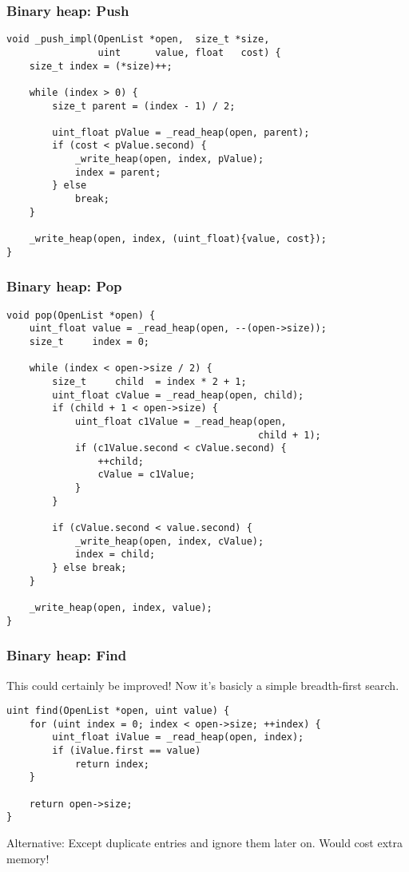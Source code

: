 \documentclass{beamer}
\begin{document}
\begin{frame}[fragile]
    \frametitle{Binary heap: Push}
    \begin{lstlisting}
void _push_impl(OpenList *open,  size_t *size,
                uint      value, float   cost) {
    size_t index = (*size)++;

    while (index > 0) {
        size_t parent = (index - 1) / 2;

        uint_float pValue = _read_heap(open, parent);
        if (cost < pValue.second) {
            _write_heap(open, index, pValue);
            index = parent;
        } else
            break;
    }

    _write_heap(open, index, (uint_float){value, cost});
}
    \end{lstlisting}
\end{frame}

\begin{frame}[fragile]
    \frametitle{Binary heap: Pop}
    \begin{lstlisting}
void pop(OpenList *open) {
    uint_float value = _read_heap(open, --(open->size));
    size_t     index = 0;

    while (index < open->size / 2) {
        size_t     child  = index * 2 + 1;
        uint_float cValue = _read_heap(open, child);
        if (child + 1 < open->size) {
            uint_float c1Value = _read_heap(open,
                                            child + 1);
            if (c1Value.second < cValue.second) {
                ++child;
                cValue = c1Value;
            }
        }

        if (cValue.second < value.second) {
            _write_heap(open, index, cValue);
            index = child;
        } else break;
    }

    _write_heap(open, index, value);
}
    \end{lstlisting}
\end{frame}

\begin{frame}[fragile]
    \frametitle{Binary heap: Find}
    This could certainly be improved! Now it's basicly a simple breadth-first search.
    
    \begin{lstlisting}
uint find(OpenList *open, uint value) {
    for (uint index = 0; index < open->size; ++index) {
        uint_float iValue = _read_heap(open, index);
        if (iValue.first == value)
            return index;
    }

    return open->size;
}
    \end{lstlisting}
    
    Alternative: Except duplicate entries and ignore them later on. Would cost extra memory!
\end{frame}
\end{document}
